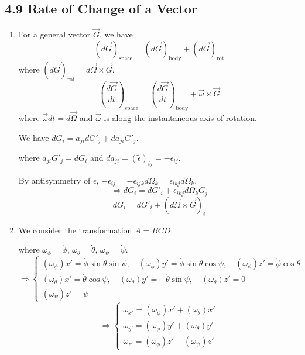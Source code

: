 \documentclass{article}
\begin{document}
	\subsection*{4.9 Rate of Change of a Vector}
	\begin{enumerate}
		\item For a general vector $\vec{G}$, we have
		\[
		(d\vec{G})_{\text{space}} = (d\vec{G})_{\text{body}} + (d\vec{G})_{\text{rot}}
		\]
		where $(d\vec{G})_{\text{rot}} = d\vec{\Omega} \times \vec{G}$.
		\[
		\left(\frac{d\vec{G}}{dt}\right)_{\text{space}} = \left(\frac{d\vec{G}}{dt}\right)_{\text{body}} + \vec{\omega} \times \vec{G}
		\]
		where $\vec{\omega}dt = d\vec{\Omega}$ and $\vec{\omega}$ is along the instantaneous axis of rotation.
		
		We have $dG_i = a_{ji}dG'_j + da_{ji}G'_j$.
		
		where $a_{ji}G'_j = dG_i$ and $d a_{ji} = (\tilde{\epsilon})_{ij} = -\epsilon_{ij}$.
		
		By antisymmetry of $\epsilon$, $-\epsilon_{ij} = -\epsilon_{ijk}d\Omega_k = \epsilon_{ikj}d\Omega_k$.
		\[
		\Rightarrow dG_i = dG'_i + \epsilon_{ikj} d\Omega_k G_j
		\]
		\[
		dG_i = dG'_i + (d\vec{\Omega} \times \vec{G})_i
		\]
		
		\item We consider the transformation $A=BCD$.
		
		where $\omega_\phi = \dot{\phi}$, $\omega_\theta=\dot{\theta}$, $\omega_\psi=\dot{\psi}$.
		\[
		\Rightarrow 
		\begin{cases}
			(\omega_\phi)x' = \dot{\phi}\sin\theta\sin\psi, \quad (\omega_\phi)y' = \dot{\phi}\sin\theta\cos\psi, \quad (\omega_\phi)z' = \dot{\phi}\cos\theta \\
			(\omega_\theta)x' = \dot{\theta}\cos\psi, \quad (\omega_\theta)y' = -\dot{\theta}\sin\psi, \quad (\omega_\theta)z' = 0 \\
			(\omega_\psi)z' = \dot{\psi}
		\end{cases}
		\]
		\[
		\Rightarrow
		\begin{cases}
			\omega_{x'} = (\omega_\phi)x' + (\omega_\theta)x' \\
			\omega_{y'} = (\omega_\phi)y' + (\omega_\theta)y' \\
			\omega_{z'} = (\omega_\phi)z' + (\omega_\psi)z'
		\end{cases}
		\]
	\end{enumerate}
	
\end{document}
